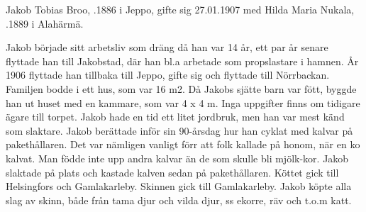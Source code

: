 Jakob Tobias Broo, .1886 i Jeppo, gifte sig 27.01.1907 med	Hilda Maria Nukala, .1889 i Alahärmä.
\begin{jhchildren}
  \item {}
  \item {}
  \item {}
  \item {}
  \item {}
  \item {}
  \item {}
  \item {}
  \item {}
  \item {}
  \item {}
  \item {}
  \item {}
  \item {}
  \item {}
\end{jhchildren}
Jakob började sitt arbetsliv som dräng då han var 14 år, ett par år senare flyttade han till Jakobstad, där han bl.a arbetade som propslastare i hamnen. År 1906 flyttade han tillbaka till Jeppo, gifte sig och flyttade till Nörrbackan. Familjen bodde i ett hus, som var 16 m2. Då Jakobs sjätte barn var fött, byggde han ut huset med en kammare, som var 4 x 4 m. Inga uppgifter finns om tidigare ägare till torpet.
Jakob hade en tid ett litet jordbruk, men han var mest känd som slaktare. Jakob berättade inför sin 90-årsdag hur han cyklat med kalvar på pakethållaren. Det var nämligen vanligt förr att folk kallade på honom, när en ko kalvat. Man födde inte upp andra kalvar än de som skulle bli mjölk-kor. Jakob slaktade på plats och kastade kalven sedan på pakethållaren. Köttet gick till Helsingfors och Gamlakarleby. Skinnen gick till Gamlakarleby. Jakob köpte alla slag av skinn, både 			från tama djur och vilda djur, ss ekorre, räv och t.o.m katt.

